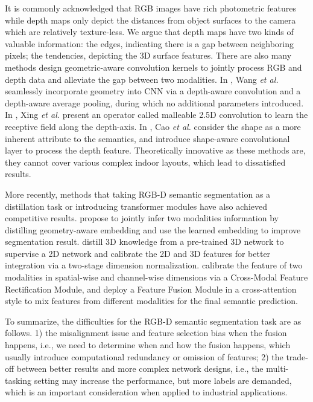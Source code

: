 ﻿\documentclass[journal]{IEEEtran}
\begin{document}
    It is commonly acknowledged that RGB images have rich photometric features while depth maps only depict the distances from object surfaces to the camera which are relatively texture-less. We argue that depth maps have two kinds of valuable information: the edges, indicating there is a gap between neighboring pixels; the tendencies, depicting the 3D surface features. There are also many methods design geometric-aware convolution kernels to jointly process RGB and depth data and alleviate the gap between two modalities. In \cite{2018depthaware}, Wang \emph{et al.} seamlessly incorporate geometry into CNN via a depth-aware convolution and a depth-aware average pooling, during which no additional parameters introduced. In \cite{2020malleable}, Xing \emph{et al.} present an operator called malleable 2.5D convolution to learn the receptive field along the depth-axis. In \cite{2021shapeconv}, Cao \emph{et al.} consider the shape as a more inherent attribute to the semantics, and introduce shape-aware convolutional layer to process the depth feature. Theoretically innovative as these methods are, they cannot cover various complex indoor layouts, which lead to dissatisfied results. 

    More recently, methods that taking RGB-D semantic segmentation as a distillation task or introducing transformer modules have also achieved competitive results. \cite{jiao2019geometrydistillation} propose to jointly infer two modalities information by distilling geometry-aware embedding and use the learned embedding to improve segmentation result. \cite{liu2021distillation} distill 3D knowledge from a pre-trained 3D network to supervise a 2D network and calibrate the 2D and 3D features for better integration via a two-stage dimension normalization. \cite{liu2022cmx} calibrate the feature of two modalities in spatial-wise and channel-wise dimensions via a Cross-Modal Feature Rectification Module, and deploy a Feature Fusion Module in a cross-attention style to mix features from different modalities for the final semantic prediction. 
  
    To summarize, the difficulties for the RGB-D semantic segmentation task are as follows. 1) the misalignment issue and feature selection bias when the fusion happens, i.e., we need to determine when and how the fusion happens, which usually introduce computational redundancy or omission of features; 2) the trade-off between better results and more complex network designs, i.e., the multi-tasking setting may increase the performance, but more labels are demanded, which is an important consideration when applied to industrial applications. 
\end{document}
